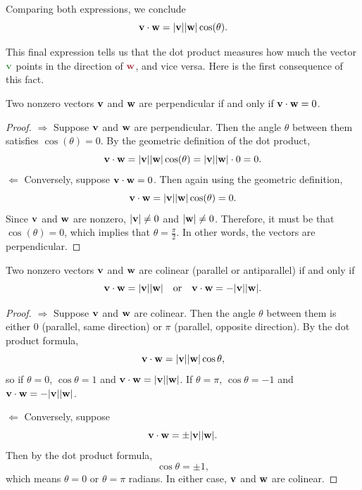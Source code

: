 Comparing both expressions, we conclude
\[
    \vb{v} \cdot \vb{w} = \abs{\vb{v}} \abs{\vb{w}} \cos(\theta).
\]

This final expression tells us that the dot product measures how much the vector \( {\color[HTML]{3a8939} \vb{v}} \) points in the direction of \( {\color[HTML]{a1212e} \vb{w}} \), and vice versa. Here is the first consequence of this fact. 

\begin{theorem}\label{thm: dot product detects orthogonality}
    Two nonzero vectors \( \vb{v} \) and \( \vb{w} \) are perpendicular if and only if \( \vb{v} \cdot \vb{w} = 0 \).
\end{theorem}
\begin{proof}
    \( \Rightarrow \) Suppose \( \vb{v} \) and \( \vb{w} \) are perpendicular. Then the angle \( \theta \) between them satisfies \( \cos(\theta) = 0 \). By the geometric definition of the dot product,
    \[
        \vb{v} \cdot \vb{w} = \abs{\vb{v}} \abs{\vb{w}} \cos(\theta) = \abs{\vb{v}} \abs{\vb{w}} \cdot 0 = 0.
    \]
    \( \Leftarrow \) Conversely, suppose \( \vb{v} \cdot \vb{w} = 0 \). Then again using the geometric definition,
    \[
        \vb{v} \cdot \vb{w} = \abs{\vb{v}} \abs{\vb{w}} \cos(\theta) = 0.
    \]
    Since \( \vb{v} \) and \( \vb{w} \) are nonzero, \( \abs{\vb{v}} \neq 0 \) and \( \abs{\vb{w}} \neq 0 \). Therefore, it must be that \( \cos(\theta) = 0 \), which implies that \( \theta = \frac{\pi}{2} \). In other words, the vectors are perpendicular.
\end{proof}


\begin{theorem}
    Two nonzero vectors \( \vb{v} \) and \( \vb{w} \) are colinear (parallel or antiparallel) if and only if
    \[
        \vb{v} \cdot \vb{w} = \lvert \vb{v} \rvert \lvert \vb{w} \rvert
        \quad\text{or}\quad
        \vb{v} \cdot \vb{w} = -\lvert \vb{v} \rvert \lvert \vb{w} \rvert.
    \]
\end{theorem}
\begin{proof}
    \(\Rightarrow\)  
    Suppose \( \vb{v} \) and \( \vb{w} \) are colinear. Then the angle \(\theta\) between them is either \(0\) (parallel, same direction) or \(\pi\) (parallel, opposite direction).  
    By the dot product formula,
    \[
        \vb{v} \cdot \vb{w} = \lvert\vb{v}\rvert \lvert\vb{w}\rvert \cos\theta,
    \]
    so if \(\theta = 0\), \(\cos\theta = 1\) and \(\vb{v} \cdot \vb{w} = \lvert\vb{v}\rvert \lvert\vb{w}\rvert\).  
    If \(\theta = \pi\), \(\cos\theta = -1\) and \(\vb{v} \cdot \vb{w} = -\lvert\vb{v}\rvert \lvert\vb{w}\rvert\).

    \(\Leftarrow\) 
    Conversely, suppose
    \[
        \vb{v} \cdot \vb{w} = \pm \lvert\vb{v}\rvert \lvert\vb{w}\rvert.
    \]
    Then by the dot product formula,
    \[
        \cos\theta = \pm 1,
    \]
    which means \(\theta = 0\) or \(\theta = \pi\) radians.  
    In either case, \( \vb{v} \) and \( \vb{w} \) are colinear.
\end{proof}

